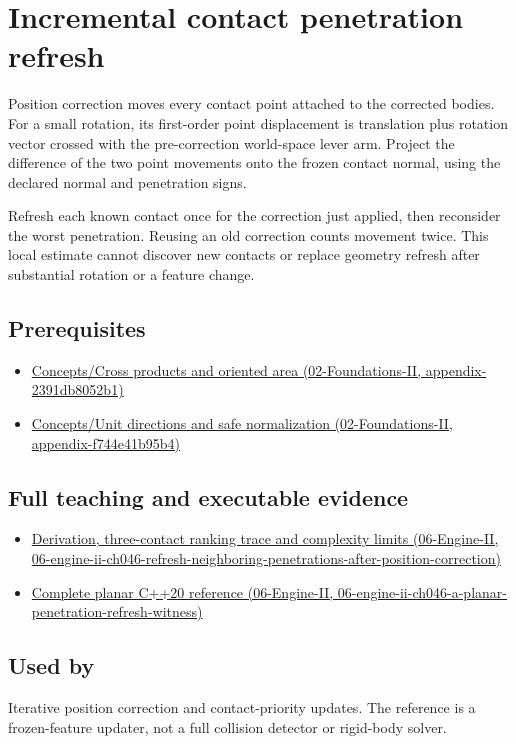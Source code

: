 \hypertarget{appendix-f682275acbdf}{}
\section{Incremental contact penetration refresh}\label{appendix-f682275acbdf-incremental-contact-penetration-refresh}

Position correction moves every contact point attached to the corrected bodies. For a small rotation, its first-order point displacement is translation plus rotation vector crossed with the pre-correction world-space lever arm. Project the difference of the two point movements onto the frozen contact normal, using the declared normal and penetration signs.

Refresh each known contact once for the correction just applied, then reconsider the worst penetration. Reusing an old correction counts movement twice. This local estimate cannot discover new contacts or replace geometry refresh after substantial rotation or a feature change.

\subsection{Prerequisites}\label{appendix-f682275acbdf-prerequisites}

\begin{itemize}
\tightlist
\item
  \href{../02-Foundations-II/main.pdf\#nameddest=appendix-2391db8052b1}{Concepts/Cross products and oriented area (02-Foundations-II, appendix-2391db8052b1)}
\item
  \href{../02-Foundations-II/main.pdf\#nameddest=appendix-f744e41b95b4}{Concepts/Unit directions and safe normalization (02-Foundations-II, appendix-f744e41b95b4)}
\end{itemize}

\subsection{Full teaching and executable evidence}\label{appendix-f682275acbdf-full-teaching-and-executable-evidence}

\begin{itemize}
\tightlist
\item
  \href{../06-Engine-II/main.pdf\#nameddest=06-engine-ii-ch046-refresh-neighboring-penetrations-after-position-correction}{Derivation, three-contact ranking trace and complexity limits (06-Engine-II, 06-engine-ii-ch046-refresh-neighboring-penetrations-after-position-correction)}
\item
  \href{../06-Engine-II/main.pdf\#nameddest=06-engine-ii-ch046-a-planar-penetration-refresh-witness}{Complete planar C++20 reference (06-Engine-II, 06-engine-ii-ch046-a-planar-penetration-refresh-witness)}
\end{itemize}

\subsection{Used by}\label{appendix-f682275acbdf-used-by}

Iterative position correction and contact-priority updates. The reference is a frozen-feature updater, not a full collision detector or rigid-body solver.
